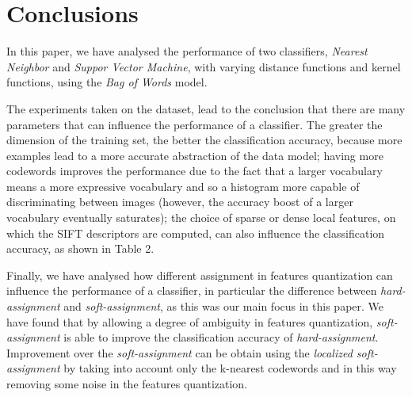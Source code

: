 \section{Conclusions}

In this paper, we have analysed the performance of two classifiers, \emph{Nearest Neighbor} and \emph{Suppor Vector Machine}, with varying distance functions and kernel functions, using the \emph{Bag of Words} model. 

The experiments taken on the dataset, lead to the conclusion that there are many parameters that can influence the performance of a classifier.
The greater the dimension of the training set, the better the classification accuracy, because more examples lead to a more accurate abstraction of the data model; having more codewords improves the performance due to the fact that a larger vocabulary means a more expressive vocabulary and so a histogram more capable of discriminating between images (however, the accuracy boost of a larger vocabulary eventually saturates); the choice of sparse or dense local features, on which the SIFT descriptors are computed, can also influence the classification accuracy, as shown in Table 2.

Finally, we have analysed how different assignment in features quantization can influence the performance of a classifier, in particular the difference between \emph{hard-assignment} and \emph{soft-assignment}, as this was our main focus in this paper.
We have found that by allowing a degree of ambiguity in features quantization, \emph{soft-assignment} is able to improve the classification accuracy of \emph{hard-assignment}. Improvement over the \emph{soft-assignment} can be obtain using the \emph{localized soft-assignment} by taking into account only the k-nearest codewords and in this way removing some noise in the features quantization.